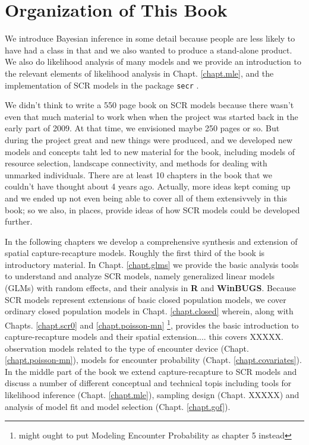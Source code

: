 \section*{Organization of This Book}

We introduce Bayesian inference in some
detail because people are less likely to have had a class in that and
we also wanted to produce a stand-alone product.   We also do
likelihood analysis of many models and we provide an introduction to
the relevant elements of likelihood analysis in
Chapt. \ref{chapt.mle}, and the 
implementation of SCR models in the package \mbox{\tt secr} \citep{efford_etal:2009euring}.

We didn't think to write a 550 page book on SCR models because there
wasn't even that much material to work when when the project was
started back in the early part of 2009. At that time, we envisioned
maybe 250 pages or so. But during the project great and new things
were produced, and we developed new models and concepts taht led to
new material for the book, including models of resource selection,
landscape connectivity, and methods for dealing with unmarked
individuals. There are at least 10 chapters in the book that we
couldn't have thought about 4 years ago. Actually, more ideas kept
coming up and we ended up not even being able to cover all of them
extensivvely in this book; so we also, in places, provide ideas of how
SCR models could be developed further.

In the following chapters we develop a comprehensive synthesis and
extension of spatial capture-recapture models.  Roughly the first
third of the book is introductory material. In
Chapt. \ref{chapt.glms} we provide the basic analysis tools to
understand and analyze SCR models, namely generalized linear models
(GLMs) with random effects, and their analysis in {\bf R} and {\bf
  WinBUGS}.  Because SCR models represent extensions of basic closed
population models, we cover ordinary closed population models in
Chapt. \ref{chapt.closed} wherein, along with Chapts. \ref{chapt.scr0}
and \ref{chapt.poisson-mn} \footnote{might ought to put Modeling
  Encounter Probability as chapter 5 instead}, provides the basic
introduction to capture-recapture models and their spatial
extension.... this covers XXXXX.  observation models related to the
type of encounter device (Chapt. \ref{chapt.poisson-mn}), models for
encounter probability (Chapt. \ref{chapt.covariates}). In the middle
part of the book we extend capture-recapture to SCR models and discuss
a number of different conceptual and technical topis including tools
for likelihood inference (Chapt. \ref{chapt.mle}), sampling design
(Chapt. XXXXX) and analysis of model fit and model selection
(Chapt. \ref{chapt.gof}).

